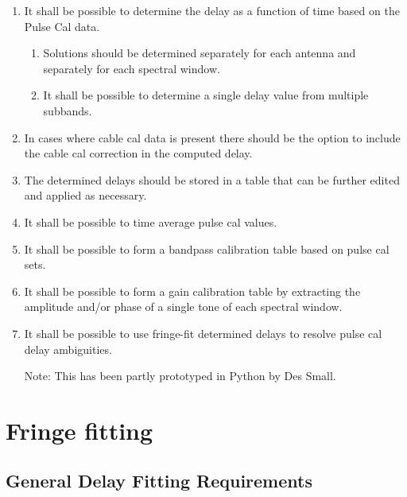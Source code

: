 \documentclass[11pt,a4paper]{article}
\begin{document}
\begin{enumerate}[subseclist]

\item It shall be possible to determine the delay as a function of
  time based on the Pulse Cal data.

\begin{enumerate}[subsecsublist]

\item Solutions should be determined separately for each antenna and
  separately for each spectral window.

\item It shall be possible to determine a single delay value from
  multiple subbands.

\end{enumerate}

\item In cases where cable cal data is present there should be the
  option to include the cable cal correction in the computed delay.

\item The determined delays should be stored in a table that can be
  further edited and applied as necessary.

\item It shall be possible to time average pulse cal values.

\item It shall be possible to form a bandpass calibration table based
     on pulse cal sets.

\item It shall be possible to form a gain calibration table by
  extracting the amplitude and/or phase of a single tone of each
  spectral window.

\item It shall be possible to use fringe-fit determined delays to
  resolve pulse cal delay ambiguities.

Note: This has been partly prototyped in Python by Des Small.

\end{enumerate}


\section{Fringe fitting}

\subsection{General Delay Fitting Requirements}
\end{document}
